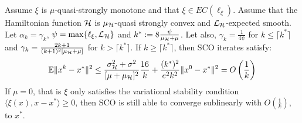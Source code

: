 \documentclass{article}
\begin{document}
\begin{theorem}
\label{SCO_DecreasingStep}
Assume $\xi$ is $\mu$-quasi-strongly monotone and that $\xi \in EC( \ell_{\xi})$. Assume that the Hamiltonian function ${\cal H}$ is $\mu_{{\cal H}}$-quasi strongly convex and ${\cal L}_{{\cal H}}$-expected smooth. Let $\alpha_k=\gamma_k$,  $\psi= \max\{  \ell_{\xi},{\cal L}_{{\cal H}}\}$ and $k^* := 8 \frac{\psi}{\mu_{{\cal H}}+\mu}$. Let also, $\gamma_k= \frac{1}{4 \psi}$ for $k \leq \lceil k^* \rceil$ and $\gamma_k= \frac{2k+1}{(k+1)^2 [\mu_{{\cal H}}+\mu]}$  for  $k >  \lceil k^* \rceil$. If $k \geq  \lceil k^* \rceil$, then SCO iterates satisfy:
\vspace{-2mm}
\begin{equation}
\mathbb{E}\| x^{k} - x^*\|^2 \le   \frac{\sigma_{{\cal H}}^2 +\sigma^2}{[\mu + \mu_{{\cal H}}]^2}\frac{16 }{k} + \frac{(k^*)^2 }{e^2 k^2}  \|x^0 - x^*\|^2 = O\left(\frac{1}{k}\right)
\end{equation}
If $\mu=0$, that is $\xi$ only satisfies the variational stability condition $\langle\xi(x),x-x^*\rangle \geq0$, then SCO is still able to converge sublinearly with $O\left(\frac{1}{k}\right)$, to $x^*$.
\end{theorem}
\end{document}
